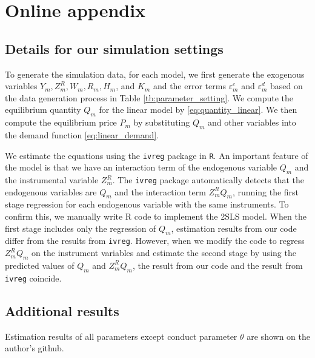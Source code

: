 \documentclass[11pt, a4paper]{article}
\begin{document}
\newpage





\newpage

\setcounter{page}{1}
\appendix
\section{Online appendix}\label{sec:appendix}




\subsection{Details for our simulation settings}

To generate the simulation data, for each model, we first generate the exogenous variables $Y_m, Z^{R}_{m}, W_m, R_{m}, H_m$, and $K_m$ and the error terms $\varepsilon_{m}^c$ and $\varepsilon_{m}^d$ based on the data generation process in Table \ref{tb:parameter_setting}.
We compute the equilibrium quantity $Q_{m}$ for the linear model by \eqref{eq:quantity_linear}.
We then compute the equilibrium price $P_m$ by substituting $Q_{m}$ and other variables into the demand function \eqref{eq:linear_demand}.

We estimate the equations using the \texttt{ivreg} package in \texttt{R}.
An important feature of the model is that we have an interaction term of the endogenous variable $Q_{m}$ and the instrumental variable $Z^{R}_{m}$.
The \texttt{ivreg} package automatically detects that the endogenous variables are $Q_{m}$ and the interaction term $Z^{R}_{m}Q_{m}$, running the first stage regression for each endogenous variable with the same instruments. To confirm this, we manually write R code to implement the 2SLS model. 
When the first stage includes only the regression of $Q_{m}$, estimation results from our code differ from the results from \texttt{ivreg}. 
However, when we modify the code to regress $Z^{R}_{m}Q_{m}$ on the instrument variables and estimate the second stage by using the predicted values of $Q_{m}$ and $Z^{R}_{m}Q_{m}$, the result from our code and the result from \texttt{ivreg} coincide.

\subsection{Additional results}
Estimation results of all parameters except conduct parameter $\theta$ are shown on the author's github.
\end{document}
